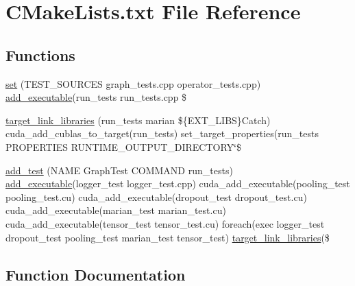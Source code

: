 \hypertarget{marian_2src_2tests_2CMakeLists_8txt}{}\section{C\+Make\+Lists.\+txt File Reference}
\label{marian_2src_2tests_2CMakeLists_8txt}
\subsection*{Functions}
\begin{DoxyCompactItemize}
\item 
\hyperlink{marian_2src_2tests_2CMakeLists_8txt_a59d4487ba23386d5b73310f034357598}{set} (T\+E\+S\+T\+\_\+\+S\+O\+U\+R\+C\+ES graph\+\_\+tests.\+cpp operator\+\_\+tests.\+cpp) \hyperlink{marian_2src_2examples_2CMakeLists_8txt_a5ee868a598e11939db5f1237cb57056d}{add\+\_\+executable}(run\+\_\+tests run\+\_\+tests.\+cpp \$
\item 
\hyperlink{marian_2src_2tests_2CMakeLists_8txt_a8105126e55165fd0260f9d9bc4a786ce}{target\+\_\+link\+\_\+libraries} (run\+\_\+tests marian \$\{E\+X\+T\+\_\+\+L\+I\+BS\}Catch) cuda\+\_\+add\+\_\+cublas\+\_\+to\+\_\+target(run\+\_\+tests) set\+\_\+target\+\_\+properties(run\+\_\+tests P\+R\+O\+P\+E\+R\+T\+I\+ES R\+U\+N\+T\+I\+M\+E\+\_\+\+O\+U\+T\+P\+U\+T\+\_\+\+D\+I\+R\+E\+C\+T\+O\+RY\char`\"{}\$
\item 
\hyperlink{marian_2src_2tests_2CMakeLists_8txt_a9e2512925448bacc3b1d70b334a2487a}{add\+\_\+test} (N\+A\+ME Graph\+Test C\+O\+M\+M\+A\+ND run\+\_\+tests) \hyperlink{marian_2src_2examples_2CMakeLists_8txt_a5ee868a598e11939db5f1237cb57056d}{add\+\_\+executable}(logger\+\_\+test logger\+\_\+test.\+cpp) cuda\+\_\+add\+\_\+executable(pooling\+\_\+test pooling\+\_\+test.\+cu) cuda\+\_\+add\+\_\+executable(dropout\+\_\+test dropout\+\_\+test.\+cu) cuda\+\_\+add\+\_\+executable(marian\+\_\+test marian\+\_\+test.\+cu) cuda\+\_\+add\+\_\+executable(tensor\+\_\+test tensor\+\_\+test.\+cu) foreach(exec logger\+\_\+test dropout\+\_\+test pooling\+\_\+test marian\+\_\+test tensor\+\_\+test) \hyperlink{marian_2src_2tests_2CMakeLists_8txt_a8105126e55165fd0260f9d9bc4a786ce}{target\+\_\+link\+\_\+libraries}(\$
\end{DoxyCompactItemize}


\subsection{Function Documentation}
